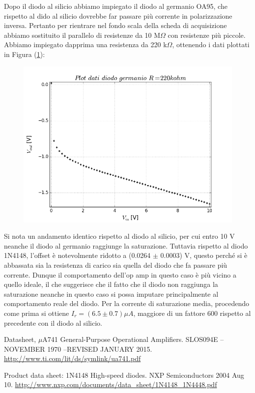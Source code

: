 \documentclass[journal, a4paper]{IEEEtran}
\begin{document}
Dopo il diodo al silicio abbiamo impiegato il diodo al germanio OA95, che rispetto al dido al silicio dovrebbe far passare più corrente in polarizzazione inversa. Pertanto per rientrare nel fondo scala della scheda di acquisizione abbiamo sostituito il parallelo di resistenze da 10 M$\Omega$ con resistenze più piccole. Abbiamo impiegato dapprima una resistenza da 220 k$\Omega$, ottenendo i dati plottati in Figura (\ref{plotdiodo_germanio_220k}):\\

\begin{figure}[htp]
\caption{}
\label{plotdiodo_germanio_220k}
\centering
\includegraphics[scale=.35]{plotdiodo_germanio_220k}
\end{figure}

Si nota un andamento identico rispetto al diodo al silicio, per cui entro 10 V neanche il diodo al germanio raggiunge la saturazione. Tuttavia rispetto al diodo 1N4148, l'offset è notevolmente ridotto a (0.0264 $\pm$ 0.0003) V, questo perché si è abbassata sia la resistenza di carico sia quella del diodo che fa passare più corrente. Dunque il comportamento dell'op amp in questo caso è più vicino a quello ideale, il che suggerisce che il fatto che il diodo non raggiunga la saturazione neanche in questo caso si possa imputare principalmente al comportamento reale del diodo. Per la corrente di saturazione media, procedendo come prima si ottiene $I_r = (6.5 \pm 0.7) \mu A$, maggiore di un fattore 600 rispetto al precedente con il diodo al silicio.


\begin{thebibliography}{5}

	Datasheet, $\mu $A741 General-Purpose Operational Amplifiers. SLOS094E – NOVEMBER 1970  –REVISED JANUARY 2015.
	\url{http://www.ti.com/lit/ds/symlink/ua741.pdf}

	Product data sheet: 1N4148 High-speed diodes. NXP Semiconductors 2004 Aug 10.
	\url{http://www.nxp.com/documents/data_sheet/1N4148_1N4448.pdf}


\end{thebibliography}

\end{document}
